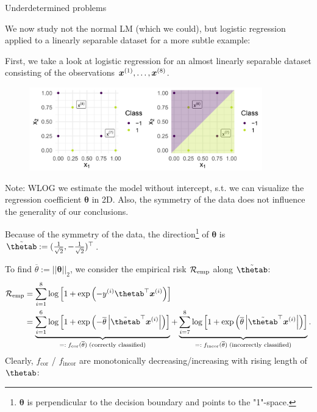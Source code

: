\begin{vbframe} {Underdetermined problems}
\framebreak
\begin{footnotesize}
We now study not the normal LM (which we could), but logistic regression applied to a linearly separable dataset for a more subtle example:

\medskip
First, we take a look at logistic regression for an almost linearly separable dataset consisting of the observations $\bm{x}^{(1)}, \dots, \bm{x}^{(8)}$.
\vfill

\begin{figure}
\includegraphics[width=0.9\textwidth]{figure_man/undet-problem01.png}\\
\end{figure}


Note: WLOG we estimate the
model without intercept, s.t. we can visualize the regression coefficient 
$\bm{\theta}$ in 2D. Also, the symmetry of the data does not influence the generality of our conclusions.
\end{footnotesize}

\framebreak
\begin{footnotesize}
Because of the symmetry of the data, the direction\footnote[frame]{$\bm{\theta}$ is perpendicular to the decision boundary and points to the "1"-space.} of $\bm{\theta}$ is $\tilde\thetab := (\frac{1}{\sqrt{2}}, -\frac{1}{\sqrt{2}})^\top$.

\medskip

To find $\overline{\theta} := ||\bm{\theta}||_2$, we consider the empirical risk $\mathcal{R}_{\text{emp}}$ along $\tilde\thetab$:
\begin{align*}
\riske &= \sum^8_{i=1} \log \left[1 + \exp \left(-y^{(i)}\thetab^\top \xv^{(i)}\right)\right] \\
&= \underbrace{\sum^6_{i=1} \log \left[1 + \exp \left(- \overline{\theta} \left|\tilde{\thetab}^\top \xv^{(i)}\right|\right)\right]}_{=: \; f_{\text{cor}}(\overline{\theta}) \;\text{(correctly classified)}} +
\underbrace{\sum^8_{i=7}\log \left[1 + \exp \left( \overline{\theta} \left| \tilde{\thetab}^\top \xv^{(i)}\right|\right)\right]}_{=:\; f_{\text{incor}}(\overline{\theta}) \;\text{(incorrectly classified)}}.
\end{align*}
Clearly, $f_{\text{cor}}$ / $f_{\text{incor}}$ are monotonically decreasing/increasing with rising length of $\thetab$:


\end{footnotesize}
\end{vbframe}
